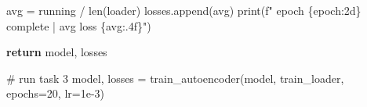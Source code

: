 \documentclass[
  letterpaper,
  DIV=11,
  numbers=noendperiod]{scrartcl}
\newenvironment{Shaded}{\begin{snugshade}}{\end{snugshade}}
\newcommand{\BuiltInTok}[1]{\textcolor[rgb]{0.00,0.23,0.31}{#1}}
\newcommand{\CommentTok}[1]{\textcolor[rgb]{0.37,0.37,0.37}{#1}}
\newcommand{\ControlFlowTok}[1]{\textcolor[rgb]{0.00,0.23,0.31}{\textbf{#1}}}
\newcommand{\DecValTok}[1]{\textcolor[rgb]{0.68,0.00,0.00}{#1}}
\newcommand{\FloatTok}[1]{\textcolor[rgb]{0.68,0.00,0.00}{#1}}
\newcommand{\NormalTok}[1]{\textcolor[rgb]{0.00,0.23,0.31}{#1}}
\newcommand{\OperatorTok}[1]{\textcolor[rgb]{0.37,0.37,0.37}{#1}}
\newcommand{\SpecialCharTok}[1]{\textcolor[rgb]{0.37,0.37,0.37}{#1}}
\newcommand{\SpecialStringTok}[1]{\textcolor[rgb]{0.13,0.47,0.30}{#1}}
\begin{document}
\begin{Shaded}
\begin{Highlighting}[]
\NormalTok{        avg }\OperatorTok{=}\NormalTok{ running }\OperatorTok{/} \BuiltInTok{len}\NormalTok{(loader)}
\NormalTok{        losses.append(avg)}
        \BuiltInTok{print}\NormalTok{(}\SpecialStringTok{f"  epoch }\SpecialCharTok{\{}\NormalTok{epoch}\SpecialCharTok{:2d\}}\SpecialStringTok{ complete | avg loss }\SpecialCharTok{\{}\NormalTok{avg}\SpecialCharTok{:.4f\}}\SpecialStringTok{"}\NormalTok{)}

    \ControlFlowTok{return}\NormalTok{ model, losses}

\CommentTok{\# run task 3}
\NormalTok{model, losses }\OperatorTok{=}\NormalTok{ train\_autoencoder(model, train\_loader, epochs}\OperatorTok{=}\DecValTok{20}\NormalTok{, lr}\OperatorTok{=}\FloatTok{1e{-}3}\NormalTok{)}
\end{Highlighting}
\end{Shaded}
\end{document}
